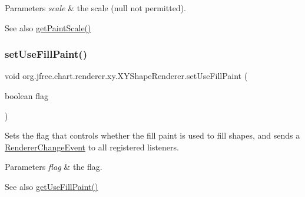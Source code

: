 \begin{DoxyParams}{Parameters}
{\em scale} & the scale ({\ttfamily null} not permitted).\\
\hline
\end{DoxyParams}
\begin{DoxySeeAlso}{See also}
\mbox{\hyperlink{classorg_1_1jfree_1_1chart_1_1renderer_1_1xy_1_1_x_y_shape_renderer_acff77b51f55ea437162422848a8c8076}{get\+Paint\+Scale()}} 
\end{DoxySeeAlso}
\mbox{\label{classorg_1_1jfree_1_1chart_1_1renderer_1_1xy_1_1_x_y_shape_renderer_ac667b765f06546dd66014cb19de5c73a}} 
\subsubsection{\texorpdfstring{set\+Use\+Fill\+Paint()}{setUseFillPaint()}}
{\footnotesize\ttfamily void org.\+jfree.\+chart.\+renderer.\+xy.\+X\+Y\+Shape\+Renderer.\+set\+Use\+Fill\+Paint (\begin{DoxyParamCaption}\item[{boolean}]{flag }\end{DoxyParamCaption})}

Sets the flag that controls whether the fill paint is used to fill shapes, and sends a \mbox{\hyperlink{}{Renderer\+Change\+Event}} to all registered listeners.


\begin{DoxyParams}{Parameters}
{\em flag} & the flag.\\
\hline
\end{DoxyParams}
\begin{DoxySeeAlso}{See also}
\mbox{\hyperlink{classorg_1_1jfree_1_1chart_1_1renderer_1_1xy_1_1_x_y_shape_renderer_a14c6842a6a18201e77ee596c41c7b726}{get\+Use\+Fill\+Paint()}} 
\end{DoxySeeAlso}
\mbox{\label{classorg_1_1jfree_1_1chart_1_1renderer_1_1xy_1_1_x_y_shape_renderer_adbe35144935f7f1a672617d4b5564db9}} 

